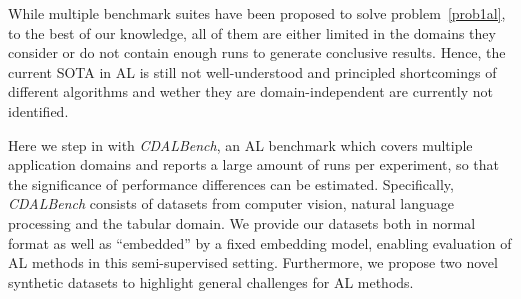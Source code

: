 \documentclass[]{article}
\begin{document}
While multiple benchmark suites have been proposed to solve
problem~\ref{prob1al}, to the best of
our knowledge, all of them are either limited in the domains they consider or do
not contain enough runs to generate conclusive results.
Hence, the current SOTA in AL is still not well-understood and principled
shortcomings of different algorithms and wether they are domain-independent are currently not identified.

Here we step in with \emph{CDALBench}, an AL benchmark which covers
multiple application domains and reports a large amount of runs per
experiment, so that the significance of performance differences can be
estimated. Specifically, \emph{CDALBench} consists of datasets from
computer vision, natural language processing and the tabular domain. We provide
our datasets both in normal format %
as well as ``embedded'' by a fixed embedding model, enabling evaluation of AL methods in
this semi-supervised setting.
Furthermore, we propose two novel synthetic datasets to highlight general
challenges for AL methods.
\end{document}
